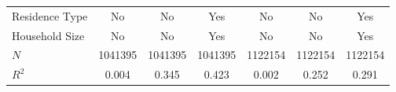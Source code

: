 \documentclass[serif, aspectratio=169]{beamer}
\begin{document}
\begin{frame}
\begin{table}[htbp]
\begin{tabular}{@{}l*{6}{c}@{}}
Residence Type&       No         &       No         &      Yes         &       No         &       No         &      Yes         \\
Household Size&       No         &       No         &      Yes         &       No         &       No         &      Yes         \\
$\textit{N}$&  1041395         &  1041395         &  1041395         &  1122154         &  1122154         &  1122154         \\
$\textit{R}^2$&    0.004         &    0.345         &    0.423         &    0.002         &    0.252         &    0.291         \\
\bottomrule
\end{tabular}
\\\\
\\

\label{tab:did_employment_status}

\end{table}

\end{frame}

\end{document}
